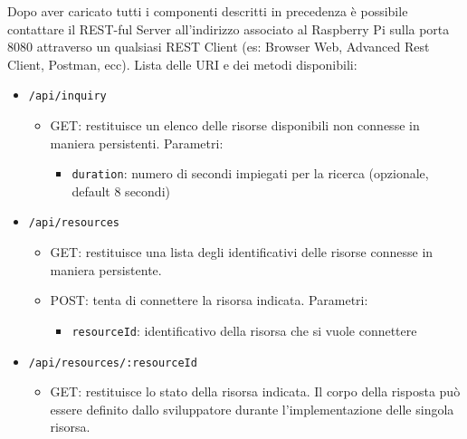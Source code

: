 \documentclass[11pt,a4paper]{article}
\begin{document}
Dopo aver caricato tutti i componenti descritti in precedenza \`e possibile contattare il REST-ful Server all'indirizzo associato al Raspberry Pi sulla porta 8080 attraverso un qualsiasi REST Client (es: Browser Web, Advanced Rest Client, Postman, ecc).
%
Lista delle URI e dei metodi disponibili:

\begin{itemize}

\item \texttt{/api/inquiry}

\begin{itemize}

\item GET: restituisce un elenco delle risorse disponibili non connesse in maniera persistenti. Parametri:

\begin{itemize}

\item \texttt{duration}: numero di secondi impiegati per la ricerca (opzionale, default 8 secondi)

\end{itemize}

\end{itemize}

\item \texttt{/api/resources}

\begin{itemize}

\item GET: restituisce una lista degli identificativi delle risorse connesse in maniera persistente.

\item POST: tenta di connettere la risorsa indicata. Parametri:

\begin{itemize}

\item \texttt{resourceId}: identificativo della risorsa che si vuole connettere

\end{itemize}

\end{itemize}

\item \texttt{/api/resources/:resourceId}

\begin{itemize}

\item GET: restituisce lo stato della risorsa indicata.
%
Il corpo della risposta pu\`o essere definito dallo sviluppatore durante l'implementazione delle singola risorsa.


\end{itemize}
\end{itemize}
\end{document}
